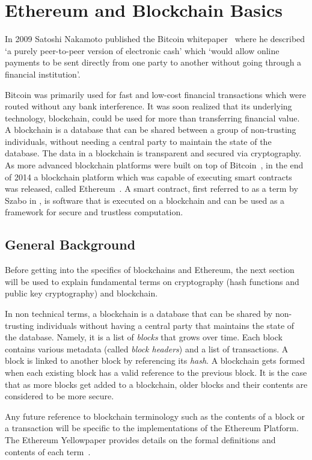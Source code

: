 \chapter{Ethereum and Blockchain Basics}\label{ch:basics}

In 2009 Satoshi Nakamoto published the Bitcoin whitepaper~\cite{bitcoin} where he described `a purely peer-to-peer version of electronic cash' which `would allow online payments to be sent directly from one party to another without going through a financial institution'. 

Bitcoin was primarily used for fast and low-cost financial transactions which were routed without any bank interference. It was soon realized that its underlying technology, blockchain, could be used for more than transferring financial value. A blockchain is a database that can be shared between a group of non-trusting individuals, without needing a central party to maintain the state of the database. The data in a blockchain is transparent and secured via cryptography. As more advanced blockchain platforms were built on top of Bitcoin~\cite{colored}, in the end of 2014 a blockchain platform which was capable of executing smart contracts was released, called Ethereum~\cite{vitalik}. A smart contract, first referred to as a term by Szabo in \cite{szabo}, is software that is executed on a blockchain and can be used as a framework for secure and trustless computation. 


\section{General Background}
Before getting into the specifics of blockchains and Ethereum, the next section will be used to explain fundamental terms on cryptography (hash functions and public key cryptography) and blockchain.

In non technical terms, a blockchain is a database that can be shared by non-trusting individuals without having a central party that maintains the state of the database. Namely, it is a list of \textit{blocks} that grows over time. Each block contains various metadata (called \textit{block headers}) and a list of transactions. A block is linked to another block by referencing its \textit{hash}. A blockchain gets formed when each existing block has a valid reference to the previous block. It is the case that as more blocks get added to a blockchain, older blocks and their contents are considered to be more secure.

Any future reference to blockchain terminology such as the contents of a block or a transaction will be specific to the implementations of the Ethereum Platform. The Ethereum Yellowpaper provides details on the formal definitions and contents of each term~\cite{ethereum}.

